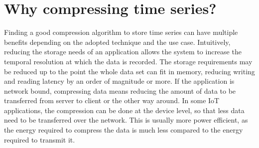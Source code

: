 \section{Why compressing time series?}
Finding a good compression algorithm to store time series can have multiple benefits depending
on the adopted technique and the use case.
Intuitively, reducing the storage needs of an application allows the system to increase the 
temporal resolution at which the data is recorded.
The storage requirements may be reduced up to the point the whole data set can fit in memory,
reducing writing and reading latency by an order of magnitude or more.
If the application is network bound, compressing data means reducing the amount of data to be
transferred from server to client or the other way around.
In some IoT applications, the compression can be done at the device level, so that less data
need to be transferred over the network. This is usually more power efficient, as the energy
required to compress the data is much less compared to the energy required to transmit it.

